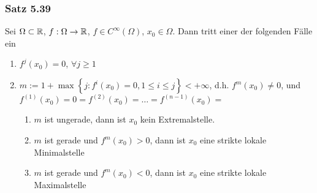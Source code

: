 \subsubsection*{Satz 5.39}
Sei $\Omega\subset\mathbb{R}$, $f:\Omega\to\mathbb{R}$, $f\in C^{\infty}\left( \Omega\right)$, $x_0\in\Omega$. Dann tritt einer der folgenden Fälle ein
\begin{enumerate}
\item $f^j(x_0)=0$, $\forall j\geq 1$
\item $m:=1+\max\left\{ j:f^i(x_0)=0, 1\leq i\leq j \right\} <+\infty $, d.h. $f^m(x_0)\not=0$, und $f^{(1)}(x_0)=0=f^{(2)}(x_0)=\dots=f^{(n-1)}(x_0)=$
\begin{enumerate}
\item[\hspace{4mm}(2.1)] $m$ ist ungerade, dann ist $x_0$ kein Extremalstelle.
\item[\hspace{4mm}(2.2)] $m$ ist gerade und $f^m(x_0)>0$, dann ist $x_0$ eine strikte lokale Minimalstelle
\item[\hspace{4mm}(2.3)] $m$ ist gerade und $f^m(x_0)<0$, dann ist $x_0$ eine strikte lokale Maximalstelle
\end{enumerate}
\end{enumerate}

